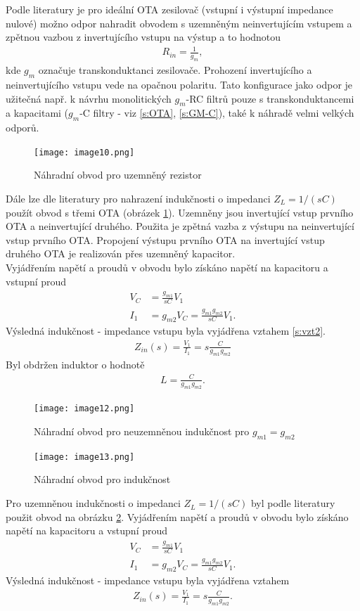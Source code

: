\noindent Podle literatury \cite{18} je pro ideální OTA zesilovač (vstupní i výstupní impedance nulové) možno odpor nahradit obvodem s uzemněným neinvertujícím vstupem a zpětnou vazbou z invertujícího vstupu na výstup a to hodnotou
\begin{align}
R_{in} = \frac{1}{g_{m}},
\end{align}
kde $g_{m}$ označuje transkonduktanci zesilovače. Prohození invertujícího a neinvertujícího vstupu vede na opačnou polaritu. Tato konfigurace jako odpor je užitečná např. k návrhu monolitických $g_m$-RC filtrů pouze s transkonduktancemi a kapacitami ($g_m$-C filtry - viz \ref{s:OTA}, \ref{s:GM-C}), také k náhradě velmi velkých odporů.
\begin{figure}[h]
\centering
\texttt{[image: image10.png]}
\caption[Náhradní obvod pro uzemněný rezistor]{Náhradní obvod pro uzemněný rezistor}
\end{figure}
\noindent Dále lze dle literatury \cite{18} pro nahrazení indukčnosti o impedanci $Z_L = 1/(sC)$ použít obvod s třemi OTA (obrázek \ref{s:IND0}). Uzemněny jsou invertující vstup prvního OTA a neinvertující druhého. Použita je zpětná vazba z výstupu na neinvertující vstup prvního OTA. Propojení výstupu prvního OTA na invertující vstup druhého OTA je realizován přes uzemněný kapacitor. \\
Vyjádřením napětí a proudů v obvodu bylo získáno napětí na kapacitoru a vstupní proud
\begin{align}\label{s:vzt2}
V_C &= \frac{g_{m1}}{sC}V_1 \\
I_1 &= g_{m2}V_C = \frac{g_{m1}g_{m2}}{sC}V_1.
\end{align}
Výsledná indukčnost - impedance vstupu byla vyjádřena vztahem \ref{s:vzt2}.
\begin{align}
Z_{in}(s) = \frac{V_1}{I_1} = s\frac{C}{g_{m1}g_{m2}}
\end{align}
\noindent Byl obdržen induktor o hodnotě
\begin{align}
L = \frac{C}{g_{m1}g_{m2}}.
\end{align}
\begin{figure}[h]
\centering
\texttt{[image: image12.png]}
\caption[Náhradní obvod pro neuzemněnou indukčnost]{Náhradní obvod pro neuzemněnou indukčnost pro $g_{m1} = g_{m2}$ \label{s:IND0}}
\end{figure}
\begin{figure}[h]
\centering
\texttt{[image: image13.png]}
\caption[Náhradní obvod pro indukčnost]{Náhradní obvod pro indukčnost \label{s:IND}}
\end{figure}
\noindent Pro uzemněnou indukčnosti o impedanci $Z_L = 1/(sC)$ byl podle literatury \cite{18} použit obvod na obrázku \ref{s:IND}. Vyjádřením napětí a proudů v obvodu bylo získáno napětí na kapacitoru a vstupní proud
\begin{align}
V_C &= \frac{g_{m1}}{sC}V_1 \\
I_1 &= g_{m2}V_C = \frac{g_{m1}g_{m2}}{sC}V_1.
\end{align}
Výsledná indukčnost - impedance vstupu byla vyjádřena vztahem
\begin{align}
Z_{in}(s) = \frac{V_1}{I_1} = s\frac{C}{g_{m1}g_{m2}}.
\end{align}

